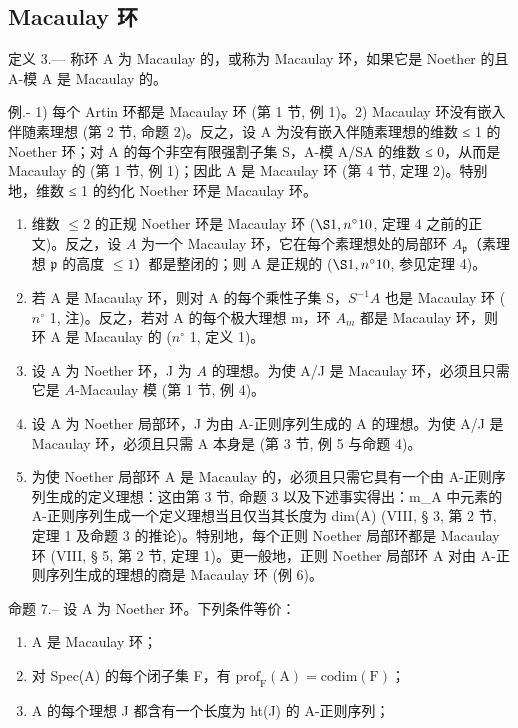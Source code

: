 \subsection{Macaulay 环}

定义 3.--- 称环 A 为 Macaulay 的，或称为 Macaulay 环，如果它是 Noether 的且 A-模 A 是 Macaulay 的。

例.- 1) 每个 Artin 环都是 Macaulay 环 (第 1 节, 例 1)。2) Macaulay 环没有嵌入伴随素理想 (第 2 节, 命题 2)。反之，设 A 为没有嵌入伴随素理想的维数 ≤ 1 的 Noether 环；对 A 的每个非空有限强割子集 S，A-模 A/SA 的维数 ≤ 0，从而是 Macaulay 的 (第 1 节, 例 1)；因此 A 是 Macaulay 环 (第 4 节, 定理 2)。特别地，维数 ≤ 1 的约化 Noether 环是 Macaulay 环。

\begin{enumerate}
\def\labelenumi{\arabic{enumi})}
\setcounter{enumi}{2}
\item
  维数 \(\leqslant 2\) 的正规 Noether 环是 Macaulay 环 (\(\S 1, n^{\circ} 10\), 定理 4 之前的正文)。反之，设 \(A\) 为一个 Macaulay 环，它在每个素理想处的局部环 \(A_{\mathfrak{p}}\)（素理想 \(\mathfrak{p}\) 的高度 \(\leqslant 1\)）都是整闭的；则 A 是正规的 (\(\S 1, n^{\circ} 10\), 参见定理 4)。
\item
  若 A 是 Macaulay 环，则对 A 的每个乘性子集 S，\(S^{-1}A\) 也是 Macaulay 环 (\(n^{\circ}\) 1, 注)。反之，若对 A 的每个极大理想 m，环 \(A_{m}\) 都是 Macaulay 环，则环 A 是 Macaulay 的 (\(n^{\circ}\) 1, 定义 1)。
\item
  设 A 为 Noether 环，J 为 \(A\) 的理想。为使 A/J 是 Macaulay 环，必须且只需它是 \(A\)-Macaulay 模 (第 1 节, 例 4)。
\item
  设 A 为 Noether 局部环，J 为由 A-正则序列生成的 A 的理想。为使 A/J 是 Macaulay 环，必须且只需 A 本身是 (第 3 节, 例 5 与命题 4)。
\item
  为使 Noether 局部环 A 是 Macaulay 的，必须且只需它具有一个由 A-正则序列生成的定义理想：这由第 3 节, 命题 3 以及下述事实得出：m\_A 中元素的 A-正则序列生成一个定义理想当且仅当其长度为 dim(A) (VIII, § 3, 第 2 节, 定理 1 及命题 3 的推论)。特别地，每个正则 Noether 局部环都是 Macaulay 环 (VIII, § 5, 第 2 节, 定理 1)。更一般地，正则 Noether 局部环 A 对由 A-正则序列生成的理想的商是 Macaulay 环 (例 6)。
\end{enumerate}

命题 7.-- 设 A 为 Noether 环。下列条件等价：

\begin{enumerate}
\def\labelenumi{(\roman{enumi})}
\item
  A 是 Macaulay 环；
\item
  对 Spec(A) 的每个闭子集 F，有 \(\mathrm{prof}_{\mathrm{F}}(\mathrm{A}) = \mathrm{codim}(\mathrm{F})\)；
\item
  A 的每个理想 J 都含有一个长度为 ht(J) 的 A-正则序列；
\end{enumerate}

